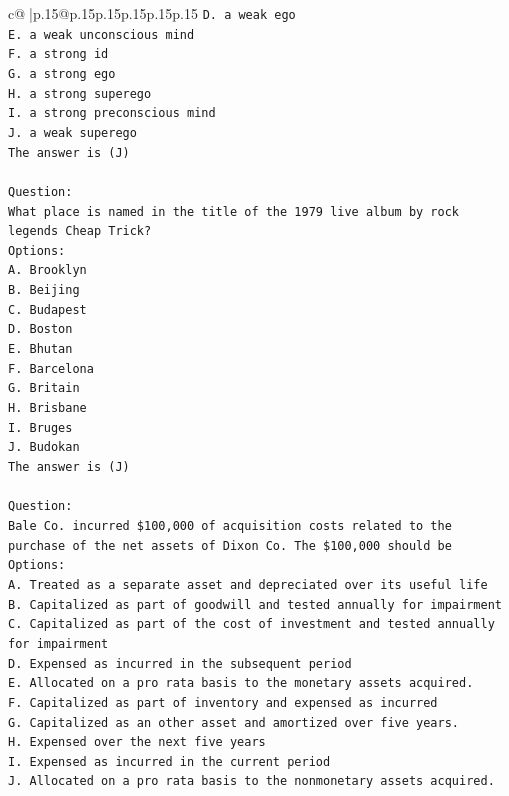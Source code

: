 \documentclass{article}
\begin{document}
{\begin{supertabular}{c@{$\;$}|p{.15\linewidth}@{}p{.15\linewidth}p{.15\linewidth}p{.15\linewidth}p{.15\linewidth}p{.15\linewidth}}
{{{\texttt{D. a weak ego} \\
\texttt{E. a weak unconscious mind} \\
\texttt{F. a strong id} \\
\texttt{G. a strong ego} \\
\texttt{H. a strong superego} \\
\texttt{I. a strong preconscious mind} \\
\texttt{J. a weak superego} \\
\texttt{The answer is (J)} \\
\\ 
\texttt{Question:} \\
\texttt{What place is named in the title of the 1979 live album by rock legends Cheap Trick?} \\
\texttt{Options:} \\
\texttt{A. Brooklyn} \\
\texttt{B. Beijing} \\
\texttt{C. Budapest} \\
\texttt{D. Boston} \\
\texttt{E. Bhutan} \\
\texttt{F. Barcelona} \\
\texttt{G. Britain} \\
\texttt{H. Brisbane} \\
\texttt{I. Bruges} \\
\texttt{J. Budokan} \\
\texttt{The answer is (J)} \\
\\ 
\texttt{Question:} \\
\texttt{Bale Co. incurred \$100,000 of acquisition costs related to the purchase of the net assets of Dixon Co. The \$100,000 should be} \\
\texttt{Options:} \\
\texttt{A. Treated as a separate asset and depreciated over its useful life} \\
\texttt{B. Capitalized as part of goodwill and tested annually for impairment} \\
\texttt{C. Capitalized as part of the cost of investment and tested annually for impairment} \\
\texttt{D. Expensed as incurred in the subsequent period} \\
\texttt{E. Allocated on a pro rata basis to the monetary assets acquired.} \\
\texttt{F. Capitalized as part of inventory and expensed as incurred} \\
\texttt{G. Capitalized as an other asset and amortized over five years.} \\
\texttt{H. Expensed over the next five years} \\
\texttt{I. Expensed as incurred in the current period} \\
\texttt{J. Allocated on a pro rata basis to the nonmonetary assets acquired.} \\
            }
        }
    }
     \\ \\


\end{supertabular}}
\end{document}
